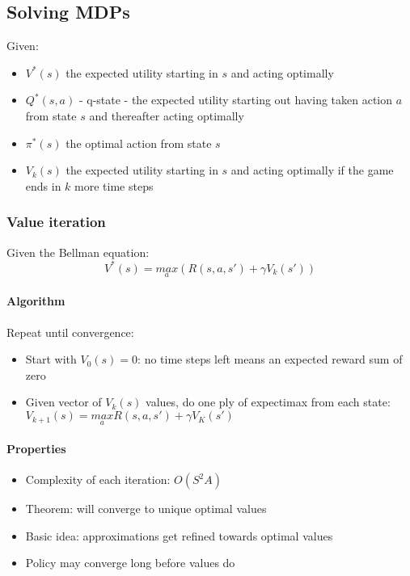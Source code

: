 \subsection{Solving MDPs}

Given:
\begin{itemize}
    \item $V^*(s)$  the expected utility starting in $s$ and acting optimally
    \item $Q^*(s, a)$ - q-state - the expected utility starting out having taken action $a$ from state $s$ and thereafter acting optimally
    \item $\pi^*(s)$ the optimal action from state $s$
    \item $V_k(s)$ the expected utility starting in $s$ and acting optimally if the game ends in $k$ more time steps
\end{itemize}

\subsubsection{Value iteration}

Given the Bellman equation:
\begin{equation}
    V^*(s) = \underset{a}{max}(R(s,a, s') + \gamma V_k(s'))
\end{equation}


\paragraph{Algorithm} Repeat until convergence:
\begin{itemize}
    \item Start with $V_0(s) = 0$: no time steps left means an expected reward sum of zero
    \item Given vector of $V_k(s)$ values, do one ply of expectimax from each state:
    \begin{math}
    V_{k+1}(s) = \underset{a}{max}{R(s,a, s') + \gamma V_K(s')}
    \end{math}
\end{itemize}

\paragraph{Properties}
\begin{itemize}
    \item Complexity of each iteration: $O(S^2A)$
    \item Theorem: will converge to unique optimal values
    \item Basic idea: approximations get refined towards optimal values
    \item Policy may converge long before values do
\end{itemize}


